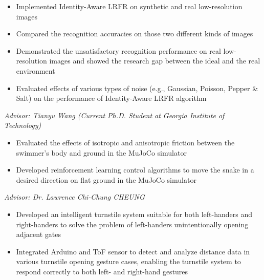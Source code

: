 \documentclass[11pt,letterpaper]{article}
\begin{document}
\cventryspace
{}
\begin{itemize}
  \item Implemented Identity-Aware LRFR on synthetic and real low-resolution images
  \item Compared the recognition accuracies on those two different kinds of images
  \item Demonstrated the unsatisfactory recognition performance on real low-resolution images and showed the research gap between the ideal and the real environment
  \item Evaluated effects of various types of noise (e.g., Gaussian, Poisson, Pepper \& Salt) on the performance of Identity-Aware LRFR algorithm
\end{itemize}

\cventryspace
{}

\textit{Advisor: Tianyu Wang (Current Ph.D. Student at Georgia Institute of Technology)}\par
\begin{itemize}
  \item Evaluated the effects of isotropic and anisotropic friction between the swimmer’s body and ground in the MuJoCo simulator
  \item Developed reinforcement learning control algorithms to move the snake in a desired direction on flat ground in the MuJoCo simulator
\end{itemize}

\cventryspace
{}
\textit{Advisor: Dr. Lawrence Chi-Chung CHEUNG}\par
{}
\begin{itemize}
  \item Developed an intelligent turnstile system suitable for both left-handers and right-handers to solve the problem of left-handers unintentionally opening adjacent gates
  \item Integrated Arduino and ToF sensor to detect and analyze distance data in various turnstile opening gesture cases, enabling the turnstile system to respond correctly to both left- and right-hand gestures
\end{itemize}
\end{document}

